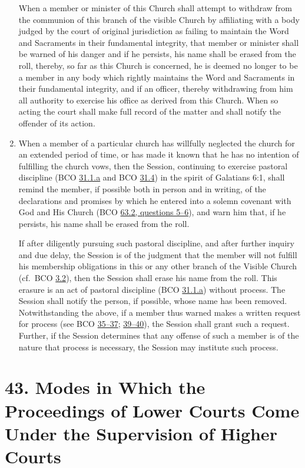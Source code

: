 \documentclass[
]{book}
\begin{document}
\begin{enumerate}
  When a member or minister of this Church shall attempt to withdraw from the communion of this branch of the visible Church by affiliating with a body judged by the court of original jurisdiction as failing to maintain the Word and Sacraments in their fundamental integrity, that member or minister shall be warned of his danger and if he persists, his name shall be erased from the roll, thereby, so far as this Church is concerned, he is deemed no longer to be a member in any body which rightly maintains the Word and Sacraments in their fundamental integrity, and if an officer, thereby withdrawing from him all authority to exercise his office as derived from this Church. When so acting the court shall make full record of the matter and shall notify the offender of its action.
\item
  \protect\hypertarget{42.4}{\href{}{}}When a member of a particular church has willfully neglected the church for an extended period of time, or has made it known that he has no intention of fulfilling the church vows, then the Session, continuing to exercise pastoral discipline (BCO \protect\hyperlink{31.1.a}{31.1.a} and BCO \protect\hyperlink{31.4}{31.4}) in the spirit of Galatians 6:1, shall remind the member, if possible both in person and in writing, of the declarations and promises by which he entered into a solemn covenant with God and His Church (BCO \protect\hyperlink{63.2.5}{63.2, questions 5--6}), and warn him that, if he persists, his name shall be erased from the roll.

  If after diligently pursuing such pastoral discipline, and after further inquiry and due delay, the Session is of the judgment that the member will not fulfill his membership obligations in this or any other branch of the Visible Church (cf.~BCO \protect\hyperlink{3.2}{3.2}), then the Session shall erase his name from the roll. This erasure is an act of pastoral discipline (BCO \protect\hyperlink{31.1.a}{31.1.a}) without process. The Session shall notify the person, if possible, whose name has been removed. Notwithstanding the above, if a member thus warned makes a written request for process (see BCO \protect\hyperlink{35}{35--37}; \protect\hyperlink{39}{39--40}), the Session shall grant such a request. Further, if the Session determines that any offense of such a member is of the nature that process is necessary, the Session may institute such process.
\end{enumerate}

\hypertarget{modes-in-which-the-proceedings-of-lower-courts-come-under-the-supervision-of-higher-courts}{%
\section*{43. Modes in Which the Proceedings of Lower Courts Come Under the Supervision of Higher Courts}\label{modes-in-which-the-proceedings-of-lower-courts-come-under-the-supervision-of-higher-courts}}
\end{document}
